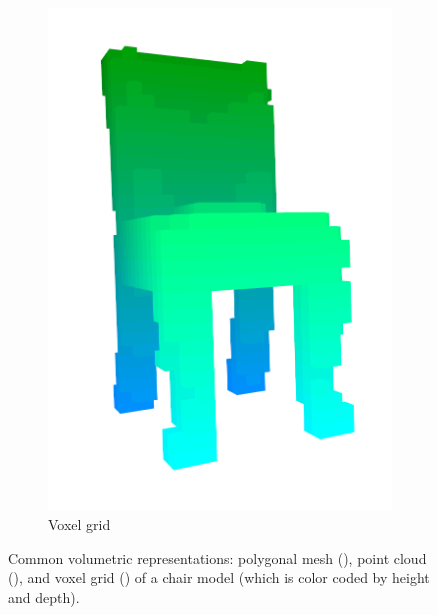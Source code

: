 \begin{figure}[!t]
\begin{subfigure}{0.2\linewidth}
		\includegraphics[width=\linewidth]{Figures/ObjRecog/chair_voxel}
		\caption{Voxel grid}
		\label{subfig:objrecog:3d_mesh_cloud_grid:grid}
	\end{subfigure}
	\caption{Common volumetric representations: polygonal mesh (), point cloud (), and voxel grid () of a chair model (which is color coded by height and depth).}
	\label{fig:objrecog:3d_mesh_cloud_grid}
\end{figure}

